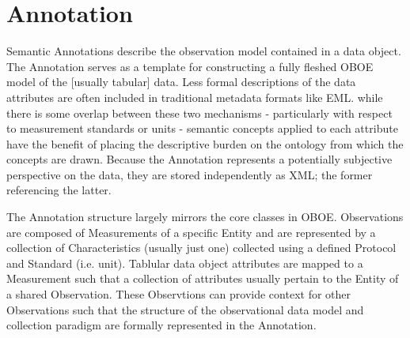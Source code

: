 
\section{Annotation}
\label{sec:annotation}

Semantic Annotations describe the observation model contained in a data object. The Annotation serves as a template for constructing a fully fleshed OBOE model of the [usually tabular] data. Less formal descriptions of the data attributes are often included in traditional metadata formats like EML. while there is some overlap between these two mechanisms - particularly with respect to measurement standards or units - semantic concepts applied to each attribute have the benefit of placing the descriptive burden on the ontology from which the concepts are drawn. Because the Annotation represents a potentially subjective perspective on the data, they are stored independently as XML; the former referencing the latter.

The Annotation structure largely mirrors the core classes in OBOE. Observations are composed of Measurements of a specific Entity and are represented by a collection of Characteristics (usually just one) collected using a defined Protocol and Standard (i.e. unit). 
Tablular data object attributes are mapped to a Measurement such that a collection of attributes usually pertain to the Entity of a shared Observation. These Observtions can provide context for other Observations such that the structure of the observational data model and collection paradigm are formally represented in the Annotation.

